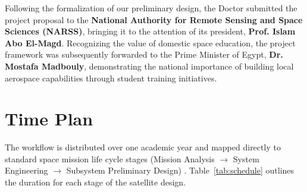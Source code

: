 ﻿\documentclass[12pt,a4paper]{report}
\begin{document}
Following the formalization of our preliminary design, the Doctor submitted the project proposal to the \textbf{National Authority for Remote Sensing and Space Sciences (NARSS)}, bringing it to the attention of its president, \textbf{Prof. Islam Abo El-Magd}. Recognizing the value of domestic space education, the project framework was subsequently forwarded to the Prime Minister of Egypt, \textbf{Dr. Mostafa Madbouly}, demonstrating the national importance of building local aerospace capabilities through student training initiatives.
\newpage
\section{Time Plan}
The workflow is distributed over one academic year and mapped directly to standard space mission life cycle stages (Mission Analysis $\rightarrow$ System Engineering $\rightarrow$ Subsystem Preliminary Design) \cite{smad3}. Table~\ref{tab:schedule} outlines the duration for each stage of the satellite design.
\end{document}
